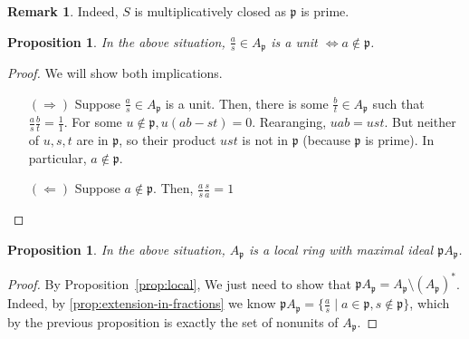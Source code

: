 \documentclass[11pt]{article}
\newtheorem{prop}[theorem]{Proposition}
\theoremstyle{definition}
\newtheorem{rk}[theorem]{Remark}
\begin{document}
        \begin{rk}
            Indeed, $S$ is multiplicatively closed as $\mathfrak{p}$ is prime.
        \end{rk}

        \begin{prop}
            In the above situation, $\frac{a}{s} \in A_{\mathfrak{p}}$ is a unit $\iff a \notin \mathfrak{p}$.
        \end{prop}
            \begin{proof}
                We will show both implications.
                \begin{itemize}
                    \item[$(\Rightarrow)$] Suppose $\frac{a}{s} \in A_{\mathfrak{p}}$ is a unit.
                    Then, there is some $\frac{b}{t} \in A_{\mathfrak{p}}$ such that $\frac{a}{s} \frac{b}{t} = \frac{1}{1}$.
                    For some $u \notin \mathfrak{p}, u (ab - st) = 0$.
                    Rearanging, $uab = ust$.
                    But neither of $u, s, t$ are in $\mathfrak{p}$, so their product $ust$ is not in $\mathfrak{p}$ (because $\mathfrak{p}$ is prime).
                    In particular, $a \notin \mathfrak{p}$.
                    \item[$(\Leftarrow)$] Suppose $a \notin \mathfrak{p}$.
                    Then, $\frac{a}{s} \frac{s}{a} = 1$
                \end{itemize}
            \end{proof}

        \begin{prop}
            In the above situation, $A_{\mathfrak{p}}$ is a local ring with maximal ideal
            $\mathfrak{p}A_{\mathfrak{p}}$.
        \end{prop}
            \begin{proof}
                
                By Proposition~\ref{prop:local}, We just need to show that $\mathfrak{p}A_{\mathfrak{p}} = A_{\mathfrak{p}} \setminus (A_{\mathfrak{p}})^*$.
                Indeed, by \ref{prop:extension-in-fractions} we know $\mathfrak{p}A_{\mathfrak{p}} = \{\frac{a}{s} \mid a \in \mathfrak{p}, s \notin \mathfrak{p} \}$, which by the previous proposition
                is exactly the set of nonunits of $A_{\mathfrak{p}}$.

            \end{proof}
\end{document}

